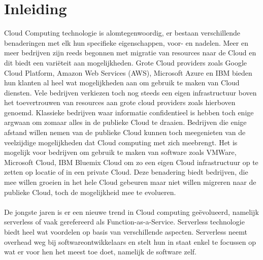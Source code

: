 
\chapter{Inleiding}
\label{ch:inleiding}

Cloud Computing technologie is alomtegenwoordig, er bestaan verschillende benaderingen met elk hun specifieke eigenschappen, voor- en nadelen. Meer en meer bedrijven zijn reeds begonnen met migratie van resources naar de Cloud en dit biedt een variëteit aan mogelijkheden. Grote Cloud providers zoals Google Cloud Platform, Amazon Web Services (AWS), Microsoft Azure en IBM bieden hun klanten al heel wat mogelijkheden aan om gebruik te maken van Cloud diensten. Vele bedrijven verkiezen toch nog steeds een eigen infrastructuur boven het toevertrouwen van resources aan grote cloud providers zoals hierboven genoemd. Klassieke bedrijven waar informatie confidentieel is hebben toch enige argwaan om zomaar alles in de publieke Cloud te draaien. Bedrijven die enige afstand willen nemen van de publieke Cloud kunnen toch meegenieten van de veelzijdige mogelijkheden dat Cloud computing met zich meebrengt. Het is mogelijk voor bedrijven om gebruik te maken van software zoals VMWare, Microsoft Cloud, IBM Bluemix Cloud om zo een eigen Cloud infrastructuur op te zetten op locatie of in een private Cloud. Deze benadering biedt bedrijven, die mee willen groeien in het hele Cloud gebeuren maar niet willen migreren naar de publieke Cloud, toch de mogelijkheid mee te evolueren.
\\\\

De jongste jaren is er een nieuwe trend in Cloud computing geëvolueerd, namelijk serverless of vaak gerefereerd als Function-as-a-Service. Serverless technologie biedt heel wat voordelen op basis van verschillende aspecten. Serverless neemt overhead weg bij softwareontwikkelaars en stelt hun in staat enkel te focussen op wat er voor hen het meest toe doet, namelijk de software zelf.
\\\\

